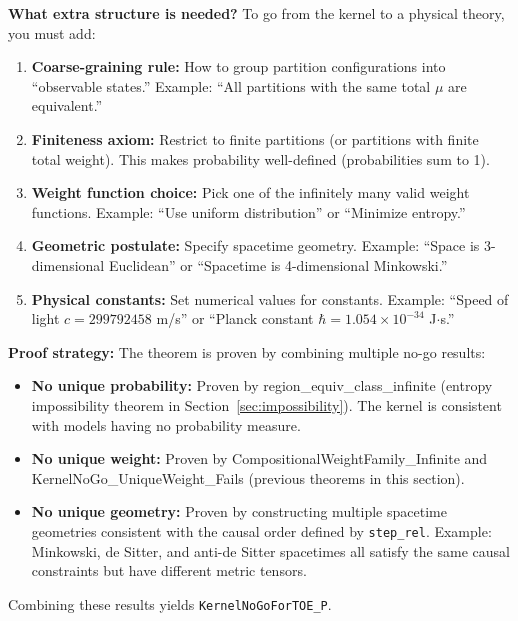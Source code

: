 \textbf{What extra structure is needed?} To go from the kernel to a physical theory, you must add:
\begin{enumerate}
    \item \textbf{Coarse-graining rule:} How to group partition configurations into ``observable states.'' Example: ``All partitions with the same total $\mu$ are equivalent.''
    
    \item \textbf{Finiteness axiom:} Restrict to finite partitions (or partitions with finite total weight). This makes probability well-defined (probabilities sum to 1).
    
    \item \textbf{Weight function choice:} Pick one of the infinitely many valid weight functions. Example: ``Use uniform distribution'' or ``Minimize entropy.''
    
    \item \textbf{Geometric postulate:} Specify spacetime geometry. Example: ``Space is 3-dimensional Euclidean'' or ``Spacetime is 4-dimensional Minkowski.''
    
    \item \textbf{Physical constants:} Set numerical values for constants. Example: ``Speed of light $c = 299792458$ m/s'' or ``Planck constant $\hbar = 1.054 \times 10^{-34}$ J$\cdot$s.''
\end{enumerate}

\textbf{Proof strategy:} The theorem is proven by combining multiple no-go results:
\begin{itemize}
    \item \textbf{No unique probability:} Proven by region\_equiv\_class\_infinite (entropy impossibility theorem in Section~\ref{sec:impossibility}). The kernel is consistent with models having no probability measure.
    
    \item \textbf{No unique weight:} Proven by CompositionalWeightFamily\_Infinite and KernelNoGo\_UniqueWeight\_Fails (previous theorems in this section).
    
    \item \textbf{No unique geometry:} Proven by constructing multiple spacetime geometries consistent with the causal order defined by \texttt{step\_rel}. Example: Minkowski, de Sitter, and anti-de Sitter spacetimes all satisfy the same causal constraints but have different metric tensors.
\end{itemize}
Combining these results yields \texttt{KernelNoGoForTOE\_P}.

